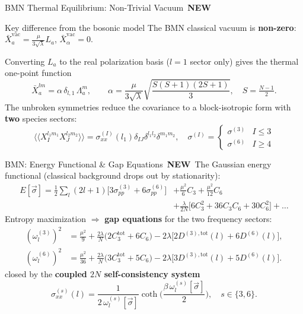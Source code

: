 \documentclass{beamer}
\newcommand{\hl}[1]{{\color{metured}\textbf{#1}}}
\newcommand{\new}[1]{{\color{metuaccent}\textbf{#1}}}
\newcommand{\newflag}{\hfill{\footnotesize\colorbox{metugold}{\color{white}\bfseries\,NEW\,}}}
\newcommand{\dbk}[1]{\langle\langle #1 \rangle\rangle}
\begin{document}
\begin{frame}{BMN Thermal Equilibrium: Non-Trivial Vacuum \newflag}
  \begin{alertblock}{Key difference from the bosonic model}
    The BMN classical vacuum is \hl{non-zero}: $\bar X_a^{\text{vac}}=\tfrac{\mu}{3\sqrt\lambda}L_a$, $\bar X_\alpha^{\text{vac}}=0$.
  \end{alertblock}
  Converting $L_a$ to the real polarization basis ($l=1$ sector only) gives the thermal one-point function
  \begin{equation*}
    \bar X_a^{lm}=\alpha\,\delta_{l,1}\,\Lambda_a^m,\qquad
    \alpha=\frac{\mu}{3\sqrt\lambda}\sqrt{\frac{S(S+1)(2S+1)}{3}},\quad S=\tfrac{N-1}{2}.
  \end{equation*}
  The unbroken symmetries reduce the covariance to a block-isotropic form with \new{two} species sectors:
  \begin{equation*}
    \dbk{X_I^{l_1m_1}X_J^{l_2m_2}}=\sigma_{xx}^{(I)}(l_1)\delta_{IJ}\delta^{l_1l_2}\delta^{m_1m_2},\quad
    \sigma^{(I)}=\begin{cases}\sigma^{(3)} & I\le 3\\ \sigma^{(6)} & I\ge 4\end{cases}
  \end{equation*}
\end{frame}

\begin{frame}{BMN: Energy Functional \& Gap Equations \newflag}
  The Gaussian energy functional (classical background drops out by stationarity):
  {\footnotesize
  \begin{align*}
    E[\vec\sigma]=\tfrac{1}{2}\sum_l(2l+1)\big[3\sigma_{pp}^{(3)}+6\sigma_{pp}^{(6)}\big]
      &+\tfrac{\mu^2}{6}C_3+\tfrac{\mu^2}{12}C_6\\
      &+\tfrac{\lambda}{2N}\big[6C_3^2+36C_3C_6+30C_6^2\big]+\dots
  \end{align*}}
  Entropy maximization $\Rightarrow$ \hl{gap equations} for the two frequency sectors:
  {\footnotesize
  \begin{align*}
    (\omega_l^{(3)})^2 &= \tfrac{\mu^2}{9}+\tfrac{2\lambda}{N}\big(2C_3^{\text{tot}}+6C_6\big)-2\lambda\big[2D^{(3),\text{tot}}(l)+6D^{(6)}(l)\big],\\
    (\omega_l^{(6)})^2 &= \tfrac{\mu^2}{36}+\tfrac{2\lambda}{N}\big(3C_3^{\text{tot}}+5C_6\big)-2\lambda\big[3D^{(3),\text{tot}}(l)+5D^{(6)}(l)\big].
  \end{align*}}
  closed by the \hl{coupled $2N$ self-consistency system}
  \begin{equation*}
    \sigma_{xx}^{(s)}(l)=\frac{1}{2\,\omega_l^{(s)}[\vec\sigma]}\coth\!\Big(\frac{\beta\,\omega_l^{(s)}[\vec\sigma]}{2}\Big),\quad s\in\{3,6\}.
  \end{equation*}
\end{frame}
\end{document}
